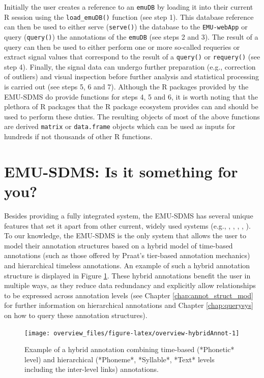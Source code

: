 \documentclass[]{book}
\theoremstyle{definition}
\theoremstyle{definition}
\theoremstyle{definition}
\theoremstyle{remark}
\begin{document}
Initially the user creates a reference to an \texttt{emuDB} by loading
it into their current R session using the \texttt{load\_emuDB()}
function (see step 1). This database reference can then be used to
either serve (\texttt{serve()}) the database to the \texttt{EMU-webApp}
or query (\texttt{query()}) the annotations of the \texttt{emuDB} (see
steps 2 and 3). The result of a query can then be used to either perform
one or more so-called requeries or extract signal values that correspond
to the result of a \texttt{query()} or \texttt{requery()} (see step 4).
Finally, the signal data can undergo further preparation (e.g.,
correction of outliers) and visual inspection before further analysis
and statistical processing is carried out (see steps 5, 6 and 7).
Although the R packages provided by the EMU-SDMS do provide functions
for steps 4, 5 and 6, it is worth noting that the plethora of R packages
that the R package ecosystem provides can and should be used to perform
these duties. The resulting objects of most of the above functions are
derived \texttt{matrix} or \texttt{data.frame} objects which can be used
as inputs for hundreds if not thousands of other R functions.

\hypertarget{emu-sdms-is-it-something-for-you}{%
\section{EMU-SDMS: Is it something for
you?}\label{emu-sdms-is-it-something-for-you}}

Besides providing a fully integrated system, the EMU-SDMS has several
unique features that set it apart from other current, widely used
systems (e.g., \citet{boersma:2011a}, \citet{wittenburg:2006a},
\citet{fromont:2012a}, \citet{rose:2006a}, \citet{mcauliffe:2016a}). To
our knowledge, the EMU-SDMS is the only system that allows the user to
model their annotation structures based on a hybrid model of time-based
annotations (such as those offered by Praat's tier-based annotation
mechanics) and hierarchical timeless annotations. An example of such a
hybrid annotation structure is displayed in Figure
\ref{fig:overview-hybridAnnot}. These hybrid annotations benefit the
user in multiple ways, as they reduce data redundancy and explicitly
allow relationships to be expressed across annotation levels (see
Chapter \ref{chap:annot_struct_mod} for further information on
hierarchical annotations and Chapter \ref{chap:querysys} on how to query
these annotation structures).

\begin{figure}

{\centering \texttt{[image: overview\_files/figure-latex/overview-hybridAnnot-1]} 

}

\caption{Example of a hybrid annotation combining time-based (*Phonetic* level) and hierarchical (*Phoneme*, *Syllable*, *Text* levels including the inter-level links) annotations.}\label{fig:overview-hybridAnnot}
\end{figure}
\end{document}

